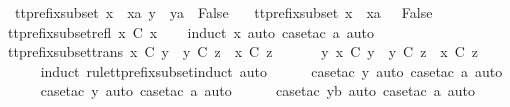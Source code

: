 \begin{isabellebody}
\ \ {\isachardoublequoteopen}tt{\isacharunderscore}prefix{\isacharunderscore}subset\ {\isacharparenleft}x\ {\isacharhash}\ xa{\isacharparenright}\ {\isacharparenleft}y\ {\isacharhash}\ ya{\isacharparenright}\ {\isacharequal}\ False{\isachardoublequoteclose}\ {\isacharbar}\isanewline
\ \ {\isachardoublequoteopen}tt{\isacharunderscore}prefix{\isacharunderscore}subset\ {\isacharparenleft}x\ {\isacharhash}\ xa{\isacharparenright}\ {\isacharbrackleft}{\isacharbrackright}\ {\isacharequal}\ False{\isachardoublequoteclose}\isanewline
\isanewline
{}\isamarkupfalse%
\ tt{\isacharunderscore}prefix{\isacharunderscore}subset{\isacharunderscore}refl{\isacharcolon}\ {\isachardoublequoteopen}x\ {\isasymlesssim}\isactrlsub C\ x{\isachardoublequoteclose}\isanewline
%
\isadelimproof
\ \ %
\endisadelimproof
%
\isatagproof
{}\isamarkupfalse%
\ {\isacharparenleft}induct\ x{\isacharcomma}\ auto{\isacharcomma}\ case{\isacharunderscore}tac\ a{\isacharcomma}\ auto{\isacharparenright}%
\endisatagproof
{\isafoldproof}%
%
\isadelimproof
\isanewline
%
\endisadelimproof
\isanewline
{}\isamarkupfalse%
\ tt{\isacharunderscore}prefix{\isacharunderscore}subset{\isacharunderscore}trans{\isacharcolon}\ {\isachardoublequoteopen}x\ {\isasymlesssim}\isactrlsub C\ y\ {\isasymLongrightarrow}\ y\ {\isasymlesssim}\isactrlsub C\ z\ {\isasymLongrightarrow}\ x\ {\isasymlesssim}\isactrlsub C\ z{\isachardoublequoteclose}\isanewline
%
\isadelimproof
%
\endisadelimproof
%
\isatagproof
{}\isamarkupfalse%
\ {\isacharminus}\isanewline
\ \ \isamarkupfalse%
\ {\isachardoublequoteopen}{\isasymexists}\ y{\isachardot}\ x\ {\isasymlesssim}\isactrlsub C\ y\ {\isasymand}\ y\ {\isasymlesssim}\isactrlsub C\ z\ {\isasymLongrightarrow}\ x\ {\isasymlesssim}\isactrlsub C\ z{\isachardoublequoteclose}\isanewline
\ \ \ \ \isamarkupfalse%
\ {\isacharparenleft}induct\ rule{\isacharcolon}tt{\isacharunderscore}prefix{\isacharunderscore}subset{\isachardot}induct{\isacharcomma}\ auto{\isacharparenright}\isanewline
\ \ \ \ \isamarkupfalse%
\ {\isacharparenleft}case{\isacharunderscore}tac\ y{\isacharcomma}\ auto{\isacharcomma}\ case{\isacharunderscore}tac\ a{\isacharcomma}\ auto{\isacharparenright}\isanewline
\ \ \ \ \isamarkupfalse%
\ {\isacharparenleft}case{\isacharunderscore}tac\ y{\isacharcomma}\ auto{\isacharcomma}\ case{\isacharunderscore}tac\ a{\isacharcomma}\ auto{\isacharparenright}\isanewline
\ \ \ \ \isamarkupfalse%
\ {\isacharparenleft}case{\isacharunderscore}tac\ yb{\isacharcomma}\ auto{\isacharcomma}\ case{\isacharunderscore}tac\ a{\isacharcomma}\ auto{\isacharparenright}\isanewline

\end{isabellebody}

